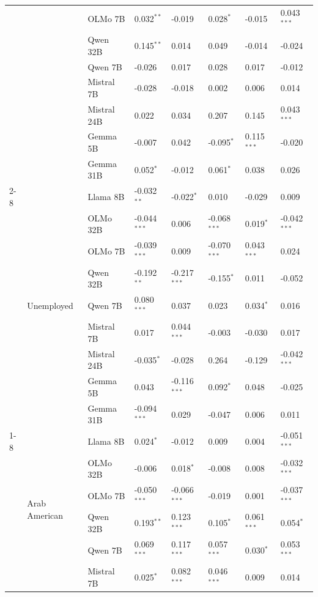 \begin{longtable}[t]{llllllll}
 &  & OLMo 7B & 0.032$^{**}$ & -0.019 & 0.028$^{*}$ & -0.015 & 0.043$^{***}$ \\
 &  & Qwen 32B & 0.145$^{**}$ & 0.014 & 0.049 & -0.014 & -0.024 \\
 &  & Qwen 7B & -0.026 & 0.017 & 0.028 & 0.017 & -0.012 \\
 &  & Mistral 7B & -0.028 & -0.018 & 0.002 & 0.006 & 0.014 \\
 &  & Mistral 24B & 0.022 & 0.034 & 0.207 & 0.145 & 0.043$^{***}$ \\
 &  & Gemma 5B & -0.007 & 0.042 & -0.095$^{*}$ & 0.115$^{***}$ & -0.020 \\
 &  & Gemma 31B & 0.052$^{*}$ & -0.012 & 0.061$^{*}$ & 0.038 & 0.026 \\
\cline{2-8}
 & \multirow[t]{9}{*}{Unemployed} & Llama 8B & -0.032$^{**}$ & -0.022$^{*}$ & 0.010 & -0.029 & 0.009 \\
 &  & OLMo 32B & -0.044$^{***}$ & 0.006 & -0.068$^{***}$ & 0.019$^{*}$ & -0.042$^{***}$ \\
 &  & OLMo 7B & -0.039$^{***}$ & 0.009 & -0.070$^{***}$ & 0.043$^{***}$ & 0.024 \\
 &  & Qwen 32B & -0.192$^{**}$ & -0.217$^{***}$ & -0.155$^{*}$ & 0.011 & -0.052 \\
 &  & Qwen 7B & 0.080$^{***}$ & 0.037 & 0.023 & 0.034$^{*}$ & 0.016 \\
 &  & Mistral 7B & 0.017 & 0.044$^{***}$ & -0.003 & -0.030 & 0.017 \\
 &  & Mistral 24B & -0.035$^{*}$ & -0.028 & 0.264 & -0.129 & -0.042$^{***}$ \\
 &  & Gemma 5B & 0.043 & -0.116$^{***}$ & 0.092$^{*}$ & 0.048 & -0.025 \\
 &  & Gemma 31B & -0.094$^{***}$ & 0.029 & -0.047 & 0.006 & 0.011 \\
\cline{1-8} \cline{2-8}
\multirow[t]{54}{*}{Race} & \multirow[t]{9}{*}{Arab American} & Llama 8B & 0.024$^{*}$ & -0.012 & 0.009 & 0.004 & -0.051$^{***}$ \\
 &  & OLMo 32B & -0.006 & 0.018$^{*}$ & -0.008 & 0.008 & -0.032$^{***}$ \\
 &  & OLMo 7B & -0.050$^{***}$ & -0.066$^{***}$ & -0.019 & 0.001 & -0.037$^{***}$ \\
 &  & Qwen 32B & 0.193$^{**}$ & 0.123$^{***}$ & 0.105$^{*}$ & 0.061$^{***}$ & 0.054$^{*}$ \\
 &  & Qwen 7B & 0.069$^{***}$ & 0.117$^{***}$ & 0.057$^{***}$ & 0.030$^{*}$ & 0.053$^{***}$ \\
 &  & Mistral 7B & 0.025$^{*}$ & 0.082$^{***}$ & 0.046$^{***}$ & 0.009 & 0.014 \\

\end{longtable}
